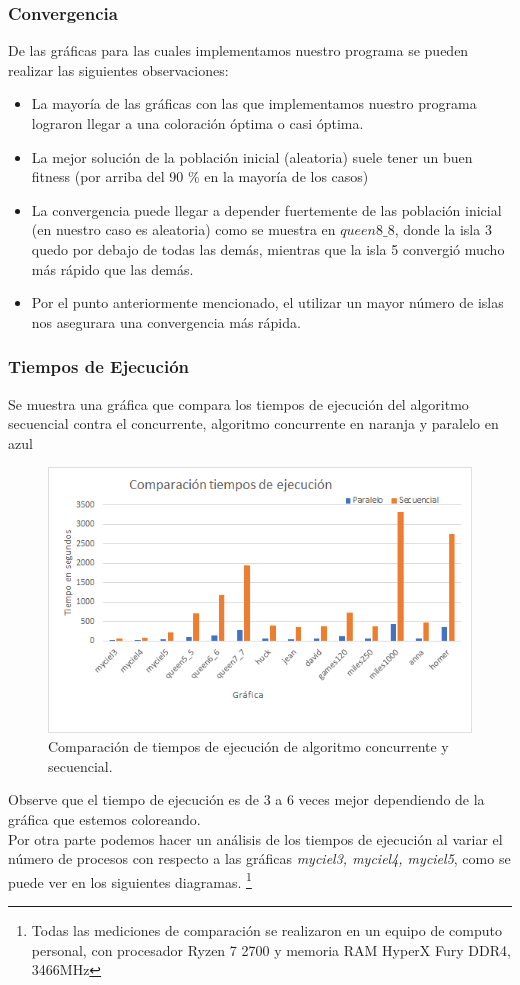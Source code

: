 \documentclass{article}
\begin{document}
\subsubsection{Convergencia}
De las gráficas para las cuales implementamos nuestro programa se pueden realizar las siguientes observaciones:
\begin{itemize}
    \item La mayoría de las gráficas con las que implementamos nuestro programa lograron llegar a una coloración óptima o casi óptima.
    \item La mejor solución de la población inicial (aleatoria) suele tener un buen fitness (por arriba del 90 \% en la mayoría de los casos)
    \item La convergencia puede llegar a depender fuertemente de las población inicial (en nuestro caso es aleatoria) como se muestra en $queen8\_8$, donde la isla 3 quedo por debajo de todas las demás, mientras que la isla 5 convergió mucho más rápido que las demás.
    \item Por el punto anteriormente mencionado, el utilizar un mayor número de islas nos asegurara una convergencia más rápida.
\end{itemize}
\subsubsection{Tiempos de Ejecución}
Se muestra una gráfica que compara los tiempos de ejecución del algoritmo secuencial contra el concurrente, algoritmo concurrente en naranja y paralelo en azul
\begin{center}
\begin{figure}[H]
    \centering
    \includegraphics[width=15cm]{ejec1.png}
    \caption{Comparación de tiempos de ejecución de algoritmo concurrente y secuencial.}
    \label{fig:my_label}
\end{figure}
\end{center} 
Observe que el tiempo de ejecución es de 3 a 6 veces mejor dependiendo de la gráfica que estemos coloreando.\\
Por otra parte podemos hacer un análisis de  los tiempos de ejecuci\'on al variar el n\'umero de procesos con respecto a las gr\'aficas \textit{myciel3, myciel4, myciel5}, como se puede ver en los siguientes diagramas. \footnote{Todas las mediciones de comparación se realizaron en un equipo de computo personal, con procesador Ryzen 7 2700 y memoria RAM HyperX Fury DDR4, 3466MHz  }
\end{document}
